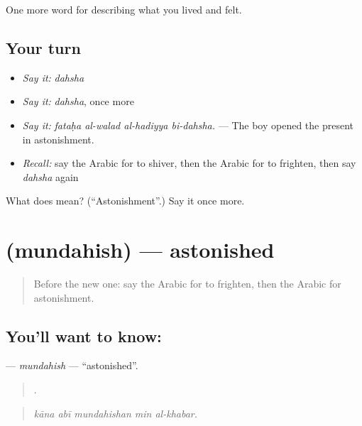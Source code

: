 \begin{grammarlens}[title={What you've built}]
One more word for describing what you lived and felt.
\end{grammarlens}

\subsection*{Your turn}
\begin{itemize}
\raggedright
  \item \emph{Say it:} \emph{dahsha}
  \item \emph{Say it:} \emph{dahsha}, once more
  \item \emph{Say it:} \emph{fataḥa al-walad al-hadiyya bi-dahsha.} — The boy opened the present in astonishment.
  \item \emph{Recall:} say the Arabic for to shiver, then the Arabic for to frighten, then say \emph{dahsha} again
\end{itemize}

\begin{tcolorbox}[breakable,colback=teal!4,colframe=teal!35!black,title={Before you move on}]
What does  mean? (\textquotedblleft{}Astonishment\textquotedblright{}.) Say it once more.
\end{tcolorbox}
\section[\texorpdfstring{\ar{مندهش} (mundahish)}{مندهش (mundahish)}]{ (mundahish) — astonished}

\label{lesson:AR-C490-mundahish}



\begin{quote}
Before the new one: say the Arabic for to frighten, then the Arabic for astonishment.
\end{quote}

\subsection*{You'll want to know: }
\textbf{} — \emph{mundahish} — \textquotedblleft{}astonished\textquotedblright{}.

\begin{quote}
    .
\end{quote}

\begin{quote}
\emph{kāna abī mundahishan min al-khabar.}
\end{quote}

